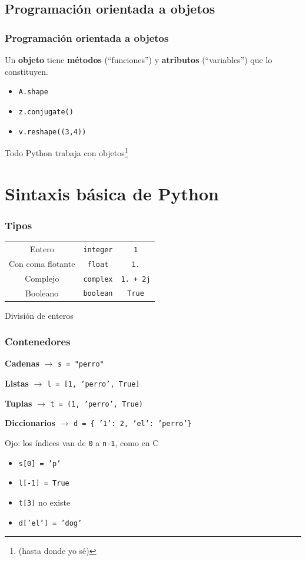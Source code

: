 \documentclass{beamer}
\begin{document}
\subsection{Programación orientada a objetos}

\begin{frame}\frametitle{Programación orientada a objetos}
	Un \textbf{objeto} tiene \textbf{métodos} (``funciones'') y \textbf{atributos} (``variables'') que lo constituyen.

	\begin{itemize}
		\item \texttt{A.shape}
		\item \texttt{z.conjugate()}
		\item \texttt{v.reshape((3,4))}
	\end{itemize}

	Todo Python trabaja con objetos\footnote{\tiny (hasta donde yo sé)}
\end{frame}


\section{Sintaxis básica de Python}

\begin{frame}\frametitle{Tipos}
	\centering
	\begin{tabular}{ccc}
		Entero 				& \texttt{integer} 			& \texttt{1} \\
		Con coma flotante	& \texttt{float} 			& \texttt{1.} \\
		Complejo 			& \texttt{complex} 			& \texttt{1. + 2j} \\
		Booleano 			& \texttt{boolean} 			& \texttt{True} \\
	\end{tabular}

	\begin{alertblock}{División de enteros}
		
	\end{alertblock}
\end{frame}

\begin{frame}\frametitle{Contenedores}
	\textbf{Cadenas} $\rightarrow$ \texttt{s = "perro"}

	\textbf{Listas} $\rightarrow$ \texttt{l = [1, 'perro', True]}

	\textbf{Tuplas} $\rightarrow$ \texttt{t = (1, 'perro', True)}

	\textbf{Diccionarios} $\rightarrow$ \texttt{d = \{ '1': 2, 'el': 'perro'\}}

	\begin{alertblock}{Ojo: los índices van de \texttt{0} a \texttt{n-1}, como en C}
		\begin{itemize}
			\item \texttt{s[0] = 'p'}
			\item \texttt{l[-1] = True}
			\item \texttt{t[3]} no existe
			\item \texttt{d['el'] = 'dog'}
		\end{itemize}
	\end{alertblock}
\end{frame}
\end{document}
